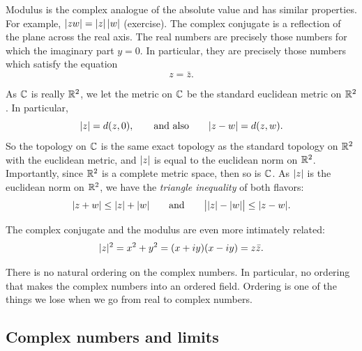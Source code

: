 Modulus is the complex analogue of the absolute value and
has similar properties.
For example,
$\lvert {zw} \rvert = \lvert {z} \rvert \, \lvert {w} \rvert$ (exercise).
The complex conjugate is a reflection of the plane across the real axis.
The real numbers are precisely those numbers for which the imaginary
part $y=0$.  In particular, they are precisely those numbers which satisfy
the equation
\begin{equation*}
z = \bar{z} .
\end{equation*}

As ${\mathbb{C}}$ is really ${\mathbb{R}}^2$, we let the metric on ${\mathbb{C}}$ be the standard
euclidean metric on ${\mathbb{R}}^2$.
In particular,
\begin{equation*}
\lvert {z} \rvert = d(z,0) , \qquad 
\text{and also} \qquad 
\lvert {z-w} \rvert = d(z,w) .
\end{equation*}
So the topology on ${\mathbb{C}}$ is
the same exact topology as the standard topology on ${\mathbb{R}}^2$
with the euclidean metric,
and $\lvert {z} \rvert$ is equal to the euclidean norm on ${\mathbb{R}}^2$.
Importantly, since ${\mathbb{R}}^2$ is a complete metric space, then
so is ${\mathbb{C}}$.
As $\lvert {z} \rvert$ is the euclidean norm on ${\mathbb{R}}^2$, we have the
\emph{triangle inequality}
of both flavors:
\begin{equation*}
\lvert {z+w} \rvert \leq \lvert {z} \rvert+\lvert {w} \rvert \qquad \text{and} \qquad
\big\lvert \lvert {z} \rvert-\lvert {w} \rvert \big\rvert \leq \lvert {z-w} \rvert .
\end{equation*}

The complex conjugate and the modulus are even more intimately related:
\begin{equation*}
\lvert {z} \rvert^2 =
x^2+y^2 =
(x+iy)(x-iy) =
z \bar{z} .
\end{equation*}

\begin{remark}
There is no natural ordering on the complex numbers.
In particular,
no ordering that makes the complex numbers into an ordered field.
Ordering is one of the things we lose when we go from real to complex
numbers.
\end{remark}

\subsection{Complex numbers and limits}

